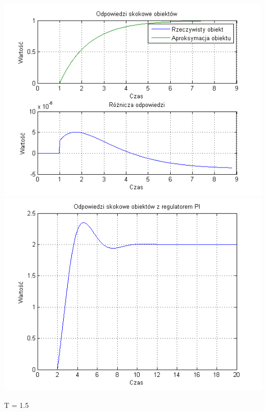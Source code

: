 \documentclass[10pt,a4paper]{article}
\begin{document}
\begin{center}
\includegraphics[scale=1]{images/jeden/skrypt_17.png}\\
\includegraphics[scale=1]{images/jeden/skrypt_18.png}\\
\end{center}
\newpage
T = 1.5
\end{document}
